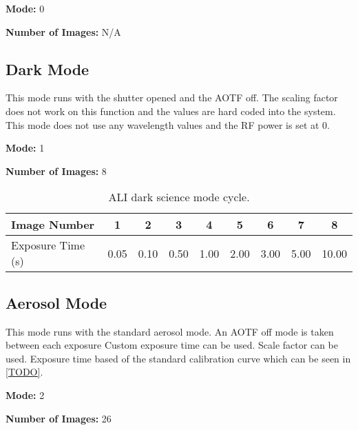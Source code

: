 \textbf{Mode:} 0

\textbf{Number of Images:} N/A

\subsection{Dark Mode}

This mode runs with the shutter opened and the AOTF off. The scaling factor does not work on this function and the values are hard coded into the system. This mode does not use any wavelength values and the RF power is set at 0.

\textbf{Mode:} 1

\textbf{Number of Images:} 8

\begin{table}
    \begin{center}
    \begin{tabular}{|l|c|c|c|c|c|c|c|c|}
    \hline
    Image Number & 1 & 2 & 3 & 4 & 5 & 6 & 7 & 8 \\
    \hline
    Exposure Time (s) & 0.05 & 0.10 & 0.50 & 1.00 & 2.00 & 3.00 & 5.00 & 10.00 \\
    \hline
    \end{tabular}
    \end{center}
    \caption[ALI Dark Science Mode Cycle]{ALI dark science mode cycle.}
    \label{tab:B.2:DarkScienceModes}
\end{table}


\subsection{Aerosol Mode}

This mode runs with the standard aerosol mode. An AOTF off mode is taken between each exposure Custom exposure time can be used. Scale factor can be used. Exposure time based of the standard calibration curve which can be seen in \autoref{TODO}.

\textbf{Mode:} 2

\textbf{Number of Images:} 26

